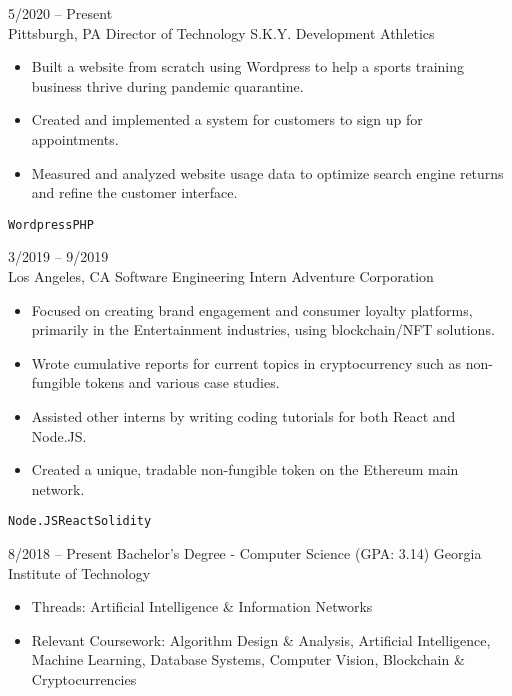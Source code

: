 \documentclass[9pt]{developercv} %
\begin{document}
\begin{entrylist}
	\entry
		{5/2020 -- Present\\\footnotesize{Pittsburgh, PA}}
		{Director of Technology}
		{S.K.Y. Development Athletics}
		{\vspace{-\baselineskip}\begin{itemize}
			\item Built a website from scratch using Wordpress to help a sports training business thrive during pandemic quarantine.
			\item Created and implemented a system for customers to sign up for appointments.
 			\item Measured and analyzed website usage data to optimize search engine returns and refine the customer interface.
		\end{itemize}\texttt{Wordpress}\slashsep\texttt{PHP}}
	\entry
		{3/2019 -- 9/2019\\\footnotesize{Los Angeles, CA}}
		{Software Engineering Intern}
		{Adventure Corporation}
		{\vspace{-\baselineskip}\begin{itemize}
			\item Focused on creating brand engagement and consumer loyalty platforms, primarily in the Entertainment industries, using blockchain/NFT solutions.
 			\item Wrote cumulative reports for current topics in cryptocurrency such as non-fungible tokens and various case studies.
			\item Assisted other interns by writing coding tutorials for both React and Node.JS.
			\item Created a unique, tradable non-fungible token on the Ethereum main network.
		\end{itemize}\texttt{Node.JS}\slashsep\texttt{React}\slashsep\texttt{Solidity}}
\end{entrylist}



\begin{entrylist}
	\entry
		{8/2018 -- Present}
		{Bachelor's Degree - Computer Science (GPA: 3.14)}
		{Georgia Institute of Technology}
		{\vspace{-\baselineskip}\begin{itemize}
			\item Threads: Artificial Intelligence \& Information Networks
 			\item Relevant Coursework: Algorithm Design \& Analysis, Artificial Intelligence, Machine Learning, Database Systems, Computer Vision, Blockchain \& Cryptocurrencies
		\end{itemize}}
\end{entrylist}
\end{document}
